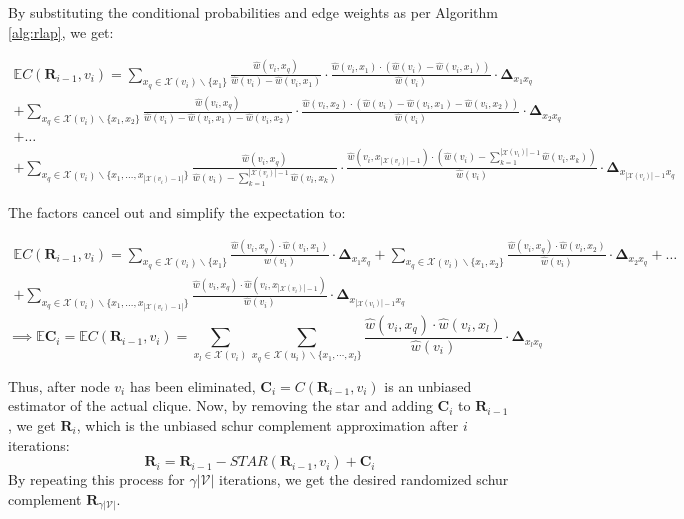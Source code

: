 \documentclass{article}
\def\mC{{\mathbf{C}}}
\def\mR{{\mathbf{R}}}
\def\gV{{\mathcal{V}}}
\theoremstyle{plain}
\theoremstyle{definition}
\theoremstyle{remark}
\begin{document}
By substituting the conditional probabilities and edge weights as per Algorithm \ref{alg:rlap}, we get:

\begin{multline*}
   \mathbb{E}C(\mR_{i-1}, v_i) = 
     \sum_{x_q \in \mathcal{X}(v_i) \backslash \{x_1\}} \frac{\hat{w}(v_i, x_q)}{\hat{w}(v_i) - \hat{w}(v_i, x_1)} \cdot \frac{\hat{w}(v_i, x_1)\cdot (\hat{w}(v_i) - \hat{w}(v_i, x_1))}{\hat{w}(v_i)} \cdot \mathbf{\Delta}_{x_1x_q} \\
  +  \sum_{x_q \in \mathcal{X}(v_i) \backslash \{x_1, x_2\}} \frac{\hat{w}(v_i, x_q)}{\hat{w}(v_i) - \hat{w}(v_i, x_1) - \hat{w}(v_i, x_2)} \cdot \frac{\hat{w}(v_i, x_2)\cdot (\hat{w}(v_i) - \hat{w}(v_i, x_1) - \hat{w}(v_i, x_2))}{\hat{w}(v_i)} \cdot \mathbf{\Delta}_{x_2x_q} \\
  + \dots \\
  + \sum_{x_q \in \mathcal{X}(v_i) \backslash \{x_1, \dots, x_{|\mathcal{X}(v_i)-1|}\}} \frac{\hat{w}(v_i, x_q)}{\hat{w}(v_i) - \sum\limits_{k=1}^{|\mathcal{X}(v_i)|-1} \hat{w}(v_i, x_k)} \cdot \frac{\hat{w}(v_i, x_{|\mathcal{X}(v_i)|-1})\cdot (\hat{w}(v_i) - \sum\limits_{k=1}^{|\mathcal{X}(v_i)|-1} \hat{w}(v_i, x_k))}{\hat{w}(v_i)} \cdot \mathbf{\Delta}_{x_{|\mathcal{X}(v_i)|-1} x_q}
\end{multline*}

The factors cancel out and simplify the expectation to:

\begin{multline*}
   \mathbb{E}C(\mR_{i-1}, v_i) = 
     \sum_{x_q \in \mathcal{X}(v_i) \backslash \{x_1\}} \frac{\hat{w}(v_i, x_q) \cdot \hat{w}(v_i, x_1)}{w(v_i)} \cdot \mathbf{\Delta}_{x_1x_q}
  +  \sum_{x_q \in \mathcal{X}(v_i) \backslash \{x_1, x_2\}} \frac{\hat{w}(v_i, x_q) \cdot \hat{w}(v_i, x_2)}{\hat{w}(v_i)} \cdot \mathbf{\Delta}_{x_2x_q} + \dots \\
  +  \sum_{x_q \in \mathcal{X}(v_i) \backslash \{x_1, \dots, x_{|\mathcal{X}(v_i)-1|}\}} \frac{\hat{w}(v_i, x_q) \cdot \hat{w}(v_i, x_{|\mathcal{X}(v_i)|-1})}{\hat{w}(v_i)} \cdot \mathbf{\Delta}_{x_{|\mathcal{X}(v_i)|-1}x_q}
\end{multline*}
\begin{equation}
    \implies \mathbb{E}\mC_i = \mathbb{E}C(\mR_{i-1}, v_i) =  \sum_{x_l \in \mathcal{X}(v_i)} \sum_{x_q \in \mathcal{X}(u_i) \backslash \{x_1, \cdots, x_l\}} \frac{\hat{w}(v_i, x_q) \cdot \hat{w}(v_i, x_l)}{\hat{w}(v_i)} \cdot \mathbf{\Delta}_{x_lx_q}
\end{equation}

Thus, after node $v_i$ has been eliminated, $\mC_i = C(\mR_{i-1}, v_i)$ is an unbiased estimator of the actual clique. Now, by removing the star and adding $\mC_i$ to $\mR_{i-1}$, we get $\mR_{i}$, which is the unbiased schur complement approximation after $i$ iterations:
\begin{equation}
\label{eq:R_star_C_relation}
    \mR_{i} = \mR_{i-1} - \textit{STAR}(\mR_{i-1}, v_i) + \mC_i
\end{equation}
By repeating this process for $\gamma|\gV|$ iterations, we get the desired randomized schur complement $\mR_{\gamma|\gV|}$.
\end{document}
